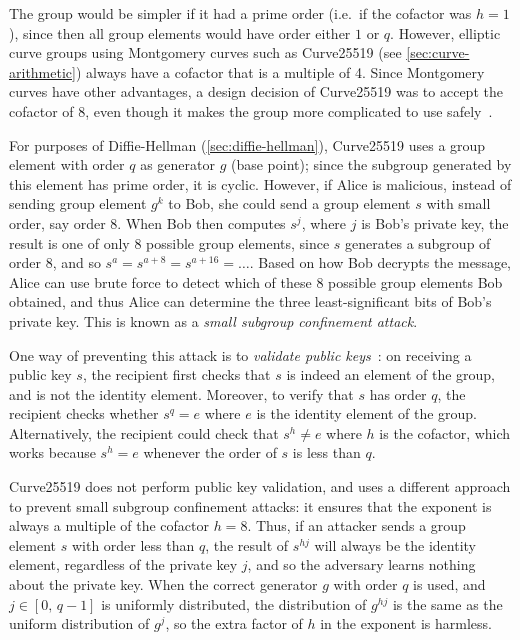 \documentclass{article}
\begin{document}
The group would be simpler if it had a prime order (i.e.\ if the cofactor was $h=1$), since then all group elements would have order either $1$ or $q$.
However, elliptic curve groups using Montgomery curves such as Curve25519 (see \autoref{sec:curve-arithmetic}) always have a cofactor that is a multiple of 4.
Since Montgomery curves have other advantages, a design decision of Curve25519 was to accept the cofactor of 8, even though it makes the group more complicated to use safely~\cite{Hamburg:2015}.

For purposes of Diffie-Hellman (\autoref{sec:diffie-hellman}), Curve25519 uses a group element with order $q$ as generator $g$ (base point); since the subgroup generated by this element has prime order, it is cyclic.
However, if Alice is malicious, instead of sending group element $g^k$ to Bob, she could send a group element $s$ with small order, say order 8.
When Bob then computes $s^j$, where $j$ is Bob's private key, the result is one of only 8 possible group elements, since $s$ generates a subgroup of order 8, and so $s^a = s^{a+8} = s^{a+16} = \dots$.
Based on how Bob decrypts the message, Alice can use brute force to detect which of these 8 possible group elements Bob obtained, and thus Alice can determine the three least-significant bits of Bob's private key.
This is known as a \emph{small subgroup confinement attack}.

One way of preventing this attack is to \emph{validate public keys}~\cite{Antipa:2003}: on receiving a public key $s$, the recipient first checks that $s$ is indeed an element of the group, and is not the identity element.
Moreover, to verify that $s$ has order $q$, the recipient checks whether $s^q = e$ where $e$ is the identity element of the group.
Alternatively, the recipient could check that $s^h \ne e$ where $h$ is the cofactor, which works because $s^h = e$ whenever the order of $s$ is less than $q$.

Curve25519 does not perform public key validation, and uses a different approach to prevent small subgroup confinement attacks: it ensures that the exponent is always a multiple of the cofactor $h=8$.
Thus, if an attacker sends a group element $s$ with order less than $q$, the result of $s^{hj}$ will always be the identity element, regardless of the private key $j$, and so the adversary learns nothing about the private key.
When the correct generator $g$ with order $q$ is used, and $j \in [0,\, q-1]$ is uniformly distributed, the distribution of $g^{hj}$ is the same as the uniform distribution of $g^j$, so the extra factor of $h$ in the exponent is harmless.
\end{document}
